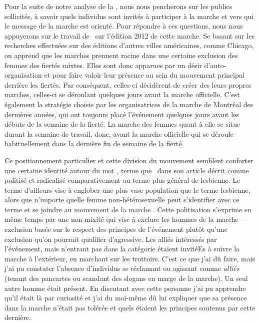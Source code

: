 Pour la suite de notre analyse de la \dm{}, nous nous pencherons sur les publics sollicités, à savoir quels individus sont invités à participer à la marche et vers qui le message de la marche est orienté. 
Pour répondre à ces questions, nous nous appuyerons sur le travail de~\cite{Podmore2015a} sur l'édition 2012 de cette marche. 
Se basant sur les recherches effectuées sur des éditions d'autres villes américaines, comme Chicago, on apprend que les marches \dykes{} prennent racine dans une certaine exclusion des femmes des fiertés mixtes. 
Elles sont donc apparues par un désir d'auto-organisation et pour faire valoir leur présence au sein du mouvement principal derrière les fiertés. 
Par conséquent, celles-ci décidèrent de créer des leurs propres marches, celles-ci se déroulant quelques jours avant la marche officielle. 
C'est également la stratégie choisie par les organisatrices de la marche de Montréal des dernières années, qui ont toujours placé l'événement quelques jours avant les débuts de la semaine de la fierté. La marche des femmes quant à elle se situe durant la semaine de travail, donc, avant la marche officielle qui se déroule habituellement dans la dernière fin de semaine de la fierté.

Ce positionnement particulier et cette division du mouvement semblent conforter une certaine identité autour du mot \dyke{}, terme que~\citet{Podmore2015a} dans son article  décrit comme politisé et radicalisé comparativement au terme plus général de lesbienne. 
Le terme \dyke{} d'ailleurs vise à englober une plus vase population que le terme lesbienne, alors que n'importe quelle femme non-hétérosexuelle peut s'identifier avec ce terme et se joindre au mouvement de la marche \dyke{}. 
Cette politisation s'exprime en même temps par une non-mixité qui vise à exclure les hommes de la marche --- exclusion basée sur le respect des principes de l'événement plutôt qu'une exclusion qu'on pourrait qualifier d'agressive. 
Les alliés intéressés par l'événement, mais n'entrant pas dans la catégorie \dyke{} étaient invitéEs à suivre la marche à l'extérieur, en marchant sur les trottoirs. 
C'est ce que j'ai dû faire, mais j'ai pu constater l'absence d'individus se réclamant ou agissant comme \emph{alliés} (tenant des pancartes ou scandant des slogans en marge de la marche). 
Un seul autre homme était présent. 
En discutant avec cette personne j'ai pu apprendre qu'il était là par curiosité et j'ai du moi-même dû lui expliquer que sa présence dans la marche n'était pas tolérée et quels étaient les principes soutenus par cette dernière.

